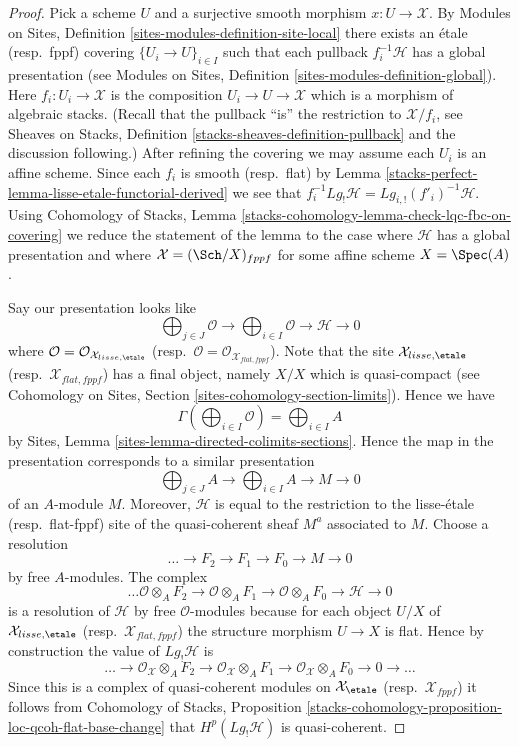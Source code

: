 \begin{proof}
Pick a scheme $U$ and a surjective smooth morphism $x : U \to \mathcal{X}$. By
Modules on Sites, Definition \ref{sites-modules-definition-site-local}
there exists an \'etale (resp.\ fppf) covering
$\{U_i \to U\}_{i \in I}$ such that each pullback $f_i^{-1}\mathcal{H}$
has a global presentation (see
Modules on Sites, Definition \ref{sites-modules-definition-global}).
Here $f_i : U_i \to \mathcal{X}$ is the composition
$U_i \to U \to \mathcal{X}$ which is a morphism of algebraic stacks.
(Recall that the pullback ``is'' the restriction to $\mathcal{X}/f_i$, see
Sheaves on Stacks, Definition \ref{stacks-sheaves-definition-pullback}
and the discussion following.)
After refining the covering we may assume each $U_i$ is an affine scheme.
Since each $f_i$ is smooth (resp.\ flat) by
Lemma \ref{stacks-perfect-lemma-lisse-etale-functorial-derived}
we see that $f_i^{-1}Lg_!\mathcal{H} = Lg_{i, !}(f'_i)^{-1}\mathcal{H}$.
Using
Cohomology of Stacks,
Lemma \ref{stacks-cohomology-lemma-check-lqc-fbc-on-covering}
we reduce the statement of the lemma to the case where $\mathcal{H}$
has a global presentation and where $\mathcal{X} = (\Sch/X)_{fppf}$
for some affine scheme $X = \Spec(A)$.

\medskip\noindent
Say our presentation looks like
$$
\bigoplus\nolimits_{j \in J} \mathcal{O} \longrightarrow
\bigoplus\nolimits_{i \in I} \mathcal{O} \longrightarrow
\mathcal{H} \longrightarrow 0
$$
where $\mathcal{O} = \mathcal{O}_{\mathcal{X}_{lisse,\etale}}$
(resp.\ $\mathcal{O} = \mathcal{O}_{\mathcal{X}_{flat,fppf}}$).
Note that the site $\mathcal{X}_{lisse,\etale}$
(resp.\ $\mathcal{X}_{flat,fppf}$) has a final object, namely
$X/X$ which is quasi-compact (see
Cohomology on Sites, Section \ref{sites-cohomology-section-limits}).
Hence we have
$$
\Gamma(\bigoplus\nolimits_{i \in I} \mathcal{O}) =
\bigoplus\nolimits_{i \in I} A
$$
by Sites, Lemma \ref{sites-lemma-directed-colimits-sections}. Hence the map
in the presentation corresponds to a similar presentation
$$
\bigoplus\nolimits_{j \in J} A \longrightarrow
\bigoplus\nolimits_{i \in I} A \longrightarrow
M \longrightarrow 0
$$
of an $A$-module $M$. Moreover, $\mathcal{H}$ is equal to the restriction
to the lisse-\'etale (resp.\ flat-fppf) site of the quasi-coherent sheaf
$M^a$ associated to $M$. Choose a resolution
$$
\ldots \to F_2 \to F_1 \to F_0 \to M \to 0
$$
by free $A$-modules. The complex
$$
\ldots \mathcal{O} \otimes_A F_2 \to \mathcal{O} \otimes_A F_1 \to
\mathcal{O} \otimes_A F_0 \to \mathcal{H} \to 0
$$
is a resolution of $\mathcal{H}$ by free $\mathcal{O}$-modules because
for each object $U/X$ of $\mathcal{X}_{lisse,\etale}$
(resp.\ $\mathcal{X}_{flat,fppf}$) the structure morphism $U \to X$
is flat. Hence by construction the value of $Lg_!\mathcal{H}$ is
$$
\ldots \to
\mathcal{O}_\mathcal{X} \otimes_A F_2 \to
\mathcal{O}_\mathcal{X} \otimes_A F_1 \to
\mathcal{O}_\mathcal{X} \otimes_A F_0 \to 0 \to \ldots
$$
Since this is a complex of quasi-coherent modules on
$\mathcal{X}_\etale$ (resp.\ $\mathcal{X}_{fppf}$)
it follows from
Cohomology of Stacks,
Proposition \ref{stacks-cohomology-proposition-loc-qcoh-flat-base-change}
that $H^p(Lg_!\mathcal{H})$ is quasi-coherent.
\end{proof}

